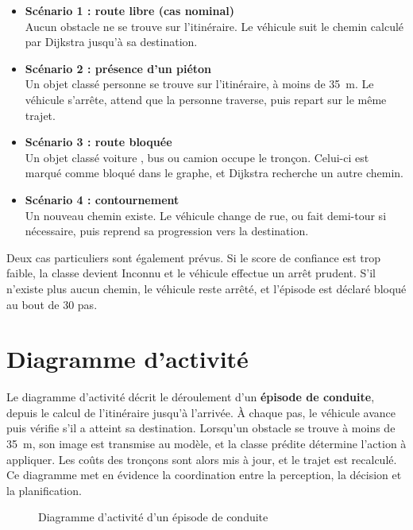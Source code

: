 \begin{itemize}
  \item \textbf{Scénario 1 : route libre (cas nominal)}\\
  Aucun obstacle ne se trouve sur l'itinéraire. Le véhicule suit le chemin calculé par Dijkstra jusqu'à sa destination.
  \item \textbf{Scénario 2 : présence d'un piéton}\\
  Un objet classé \og personne \fg{} se trouve sur l'itinéraire, à moins de 35~m. Le véhicule s'arrête, attend que la personne traverse, puis repart sur le même trajet.
  \item \textbf{Scénario 3 : route bloquée}\\
  Un objet classé \og voiture \fg{}, \og bus \fg{} ou \og camion \fg{} occupe le tronçon. Celui-ci est marqué comme bloqué dans le graphe, et Dijkstra recherche un autre chemin.
  \item \textbf{Scénario 4 : contournement}\\
  Un nouveau chemin existe. Le véhicule change de rue, ou fait demi-tour si nécessaire, puis reprend sa progression vers la destination.
\end{itemize}

Deux cas particuliers sont également prévus. Si le score de confiance est trop faible, la classe devient \og Inconnu \fg{} et le véhicule effectue un arrêt prudent. S'il n'existe plus aucun chemin, le véhicule reste arrêté, et l'épisode est déclaré \og bloqué \fg{} au bout de 30 pas.

\section{Diagramme d'activité}

Le diagramme d'activité décrit le déroulement d'un \textbf{épisode de conduite}, depuis le calcul de l'itinéraire jusqu'à l'arrivée. À chaque pas, le véhicule avance puis vérifie s'il a atteint sa destination. Lorsqu'un obstacle se trouve à moins de 35~m, son image est transmise au modèle, et la classe prédite détermine l'action à appliquer. Les coûts des tronçons sont alors mis à jour, et le trajet est recalculé. Ce diagramme met en évidence la coordination entre la perception, la décision et la planification.

\begin{figure}[H]
  \centering
  \resizebox{0.95\textwidth}{!}{}
  \caption{Diagramme d'activité d'un épisode de conduite}
\end{figure}

